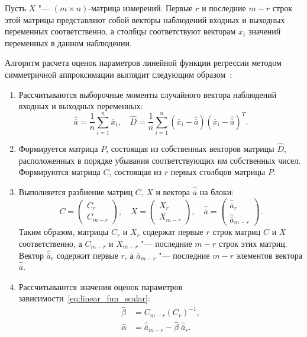 Пусть \( X \) "--- \( (m \times n) \)-матрица измерений.
Первые \( r \) и последние \( m - r \) строк этой матрицы представляют собой векторы наблюдений
входных и выходных переменных соответственно,
а столбцы соответствуют векторам \( \overline{x}_i \) значений переменных в данном наблюдении.

Алгоритм расчета оценок параметров линейной функции регрессии
методом симметричной аппроксимации выглядит следующим образом~\cite{mukha_2016}:
\begin{enumerate}
\item Рассчитываются выборочные моменты случайного вектора наблюдений входных и выходных переменных:
  \begin{equation*}
    \hat{\overline{a}} = \dfrac{1}{n} \sum_{i=1}^n \overline{x}_i, \quad
    \hat{D} =
    \dfrac{1}{n}  \sum_{i=1}^n
    (\overline{x}_i - \hat{\overline{a}})
    (\overline{x}_i - \hat{\overline{a}})^T.
  \end{equation*}
\item Формируется матрица \( P \), состоящая из собственных векторов матрицы \( \hat{D} \),
  расположенных в порядке убывания соответствующих им собственных чисел.
  Формируются матрица \( C \), состоящая из \( r \) первых столбцов матрицы \( P \).
\item Выполняется разбиение матриц \( C \), \( X \) и вектора \( \hat{\overline{a}} \) на блоки:
  \begin{equation*}
    C =
    \begin{pmatrix}
      C_r \\
      C_{m-r}
    \end{pmatrix}, \quad
    X =
    \begin{pmatrix}
      X_r \\
      X_{m-r}
    \end{pmatrix}, \quad
    \hat{\overline{a}} =
    \begin{pmatrix}
      \hat{\overline{a}}_r \\
      \hat{\overline{a}}_{m-r}
    \end{pmatrix}.
  \end{equation*}
  Таким образом, матрицы \( C_r \) и \( X_r \) содержат первые \( r \) строк матриц
  \( C \) и \( X \) соответственно,
  а \( C_{m-r} \) и \( X_{m-r} \) "--- последние \( m - r \) строк этих матриц.
  Вектор \( \hat{\overline{a}}_r \) содержит первые \( r \),
  а \( \hat{\overline{a}}_{m-r} \) "--- последние \( m - r \) элементов вектора
  \( \hat{\overline{a}} \).
\item Рассчитываются значения оценок параметров зависимости~\eqref{eq:linear_fun_scalar}:
  \begin{equation*}
    \begin{aligned}
      \hat{\beta} &= C_{m-r} (C_r)^{-1}, \\
      \hat{\alpha} &= \hat{\overline{a}}_{m-r} - \hat{\beta} \; \hat{\overline{a}}_r.
    \end{aligned}
  \end{equation*}
\end{enumerate}

